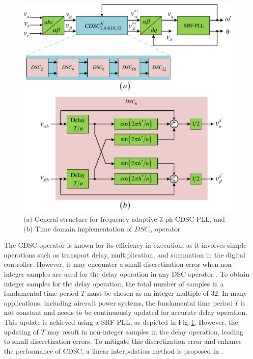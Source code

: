 \begin{figure}[h]  
	\centering
	\includegraphics[scale=0.7]{figures/Chapter_3/Mine/DSC-CDSC-PLL.pdf}
	\caption{(a) General structure for frequency adaptive 3-ph CDSC-PLL, and (b) Time domain implementation of $DSC_{n}$ operator}
	\label{fig3.7}
\end{figure}

The CDSC operator is known for its efficiency in execution, as it involves simple operations such as transport delay, multiplication, and summation in the digital controller. However, it may encounter a small discretization error when non-integer samples are used for the delay operation in any DSC operator \cite{5624643,5959976}. To obtain integer samples for the delay operation, the total number of samples in a fundamental time period $T$ must be chosen as an integer multiple of 32. In many applications, including aircraft power systems, the fundamental time period $T$ is not constant and needs to be continuously updated for accurate delay operation. This update is achieved using a SRF-PLL, as depicted in Fig.\,\ref{fig3.7}. However, the updating of $T$ may result in non-integer samples in the delay operation, leading to small discretization errors. To mitigate this discretization error and enhance the performance of CDSC, a linear interpolation method is proposed in \cite{5624643}.

